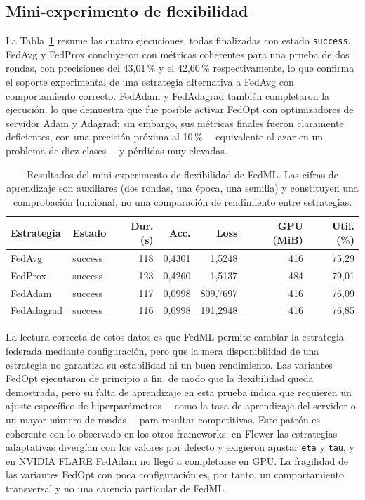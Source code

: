 \subsection{Mini-experimento de flexibilidad}\label{subsec:flex-fedml-mini}

La Tabla~\ref{tab:flex-fedml-resultados} resume las cuatro ejecuciones, todas
finalizadas con estado \texttt{success}. FedAvg y FedProx concluyeron con métricas
coherentes para una prueba de dos rondas, con precisiones del 43,01\,\% y el
42,60\,\% respectivamente, lo que confirma el soporte experimental de una estrategia
alternativa a FedAvg con comportamiento correcto. FedAdam y FedAdagrad también
completaron la ejecución, lo que demuestra que fue posible activar FedOpt con
optimizadores de servidor Adam y Adagrad; sin embargo, sus métricas finales fueron
claramente deficientes, con una precisión próxima al 10\,\% —equivalente al azar en
un problema de diez clases— y pérdidas muy elevadas.

\begin{table}[htbp]
  \centering
  \caption{Resultados del mini-experimento de flexibilidad de FedML. Las cifras de
  aprendizaje son auxiliares (dos rondas, una época, una semilla) y constituyen una
  comprobación funcional, no una comparación de rendimiento entre estrategias.}
  \label{tab:flex-fedml-resultados}
  \begin{tabular}{llrrrrr}
    \toprule
    \textbf{Estrategia} & \textbf{Estado} & \textbf{Dur. (s)} & \textbf{Acc.} &
    \textbf{Loss} & \textbf{GPU (MiB)} & \textbf{Util. (\%)} \\
    \midrule
    FedAvg     & success & 118 & 0,4301 & 1,5248   & 416 & 75,29 \\
    FedProx    & success & 123 & 0,4260 & 1,5137   & 484 & 79,01 \\
    FedAdam    & success & 117 & 0,0998 & 809,7697 & 416 & 76,09 \\
    FedAdagrad & success & 116 & 0,0998 & 191,2948 & 416 & 76,85 \\
    \bottomrule
  \end{tabular}
\end{table}

La lectura correcta de estos datos es que FedML permite cambiar la estrategia
federada mediante configuración, pero que la mera disponibilidad de una estrategia
no garantiza su estabilidad ni un buen rendimiento. Las variantes FedOpt
ejecutaron de principio a fin, de modo que la flexibilidad queda demostrada, pero su
falta de aprendizaje en esta prueba indica que requieren un ajuste específico de
hiperparámetros —como la tasa de aprendizaje del servidor o un mayor número de
rondas— para resultar competitivas. Este patrón es coherente con lo observado en los
otros frameworks: en Flower las estrategias adaptativas divergían con los valores por
defecto y exigieron ajustar \texttt{eta} y \texttt{tau}, y en NVIDIA FLARE FedAdam no
llegó a completarse en GPU. La fragilidad de las variantes FedOpt con poca
configuración es, por tanto, un comportamiento transversal y no una carencia
particular de FedML.


